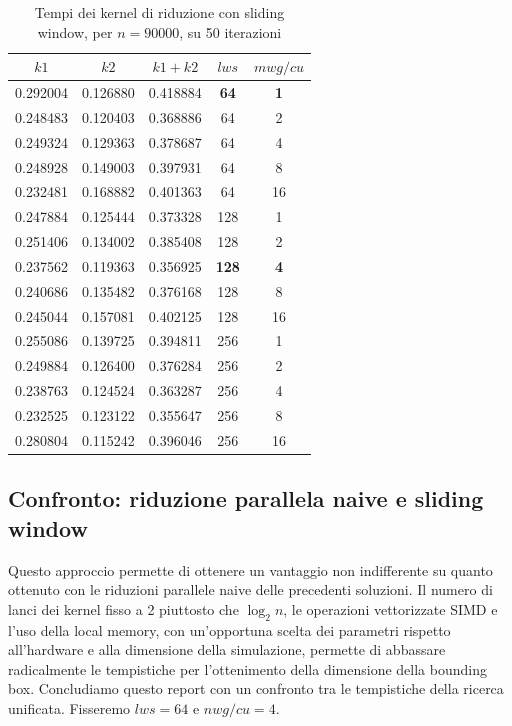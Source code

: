 \documentclass{article}
\begin{document}
		\begin{table}[h]
		\centering
		\begin{tabular}{c|c|c|c|c}
			$k1$ & $k2$ & $k1 + k2$ & $lws$ & $mwg/cu$\\
			\hline
			0.292004 &0.126880 &0.418884 &\textbf{64} &\textbf{1}\\
			0.248483 &0.120403 &0.368886 &64 &2\\
			0.249324 &0.129363 &0.378687 &64 &4\\
			0.248928 &0.149003 &0.397931 &64 &8\\
			0.232481 &0.168882 &0.401363 &64 &16\\
			0.247884 &0.125444 &0.373328 &128 &1\\
			0.251406 &0.134002 &0.385408 &128 &2\\
			0.237562 &0.119363 &0.356925 &\textbf{128} &\textbf{4}\\
			0.240686 &0.135482 &0.376168 &128 &8\\
			0.245044 &0.157081 &0.402125 &128 &16\\
			0.255086 &0.139725 &0.394811 &256 &1\\
			0.249884 &0.126400 &0.376284 &256 &2\\
			0.238763 &0.124524 &0.363287 &256 &4\\
			0.232525 &0.123122 &0.355647 &256 &8\\
			0.280804 &0.115242 &0.396046 &256 &16\\
			
		\end{tabular}
		\label{tab:2}
		\caption{Tempi dei kernel di riduzione con sliding window, per $n = 90000$, su 50 iterazioni}
	\end{table}
	
	\newpage
	\subsection{Confronto: riduzione parallela naive e sliding window}
	Questo approccio permette di ottenere un vantaggio non indifferente su quanto ottenuto con le riduzioni parallele naive delle precedenti soluzioni. Il numero di lanci dei kernel fisso a 2 piuttosto che $\log_2 n$, le operazioni vettorizzate SIMD e l'uso della local memory, con un'opportuna scelta dei parametri rispetto all'hardware e alla dimensione della simulazione, permette di abbassare radicalmente le tempistiche per l'ottenimento della dimensione della bounding box. Concludiamo questo report con un confronto tra le tempistiche della ricerca unificata. Fisseremo $lws=64$ e $nwg/cu = 4$.
	\newpage
	
\end{document}
